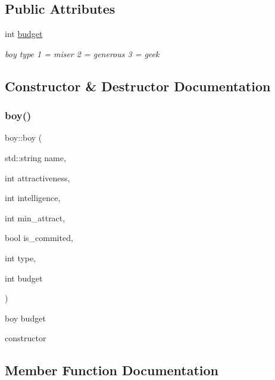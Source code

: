 \subsection*{Public Attributes}
\begin{DoxyCompactItemize}
\item 
int \hyperlink{classboy_a80d6bd6642a612cf0428ab56a2098316}{budget}
\begin{DoxyCompactList}\small\item\em boy type \textquotesingle{}1\textquotesingle{} = miser \textquotesingle{}2\textquotesingle{} = generous \textquotesingle{}3\textquotesingle{} = geek \end{DoxyCompactList}\end{DoxyCompactItemize}


\subsection{Constructor \& Destructor Documentation}
\mbox{\label{classboy_aeda8572de2e02a1707c2ca5cf1e5fadb}} 
\subsubsection{\texorpdfstring{boy()}{boy()}}
{\footnotesize\ttfamily boy\+::boy (\begin{DoxyParamCaption}\item[{std\+::string}]{name,  }\item[{int}]{attractiveness,  }\item[{int}]{intelligence,  }\item[{int}]{min\+\_\+attract,  }\item[{bool}]{is\+\_\+commited,  }\item[{int}]{type,  }\item[{int}]{budget }\end{DoxyParamCaption})}



boy budget 

constructor 

\subsection{Member Function Documentation}
\mbox{\label{classboy_a49ba309bc8a901988aec23a9485fe9b8}} 
